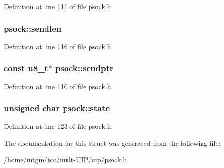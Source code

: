 Definition at line 111 of file psock.h.

\hypertarget{structpsock_a19b82696bd84a803250cbf9812f2f125}{
\subsubsection[{sendlen}]{ {\bf psock::sendlen}}}
\label{structpsock_a19b82696bd84a803250cbf9812f2f125}


Definition at line 116 of file psock.h.

\hypertarget{structpsock_a31f25efccba9fd043047133d0d0ba5ab}{
\subsubsection[{sendptr}]{\setlength{\rightskip}{0pt plus 5cm}const {\bf u8\_\-t}$\ast$ {\bf psock::sendptr}}}
\label{structpsock_a31f25efccba9fd043047133d0d0ba5ab}


Definition at line 110 of file psock.h.

\hypertarget{structpsock_afda184638130452f3570966acc5b97f9}{
\subsubsection[{state}]{\setlength{\rightskip}{0pt plus 5cm}unsigned char {\bf psock::state}}}
\label{structpsock_afda184638130452f3570966acc5b97f9}


Definition at line 123 of file psock.h.



The documentation for this struct was generated from the following file:\begin{DoxyCompactItemize}
\item 
/home/mtgm/tcc/mult-\/UIP/uip/\hyperlink{psock_8h}{psock.h}\end{DoxyCompactItemize}
